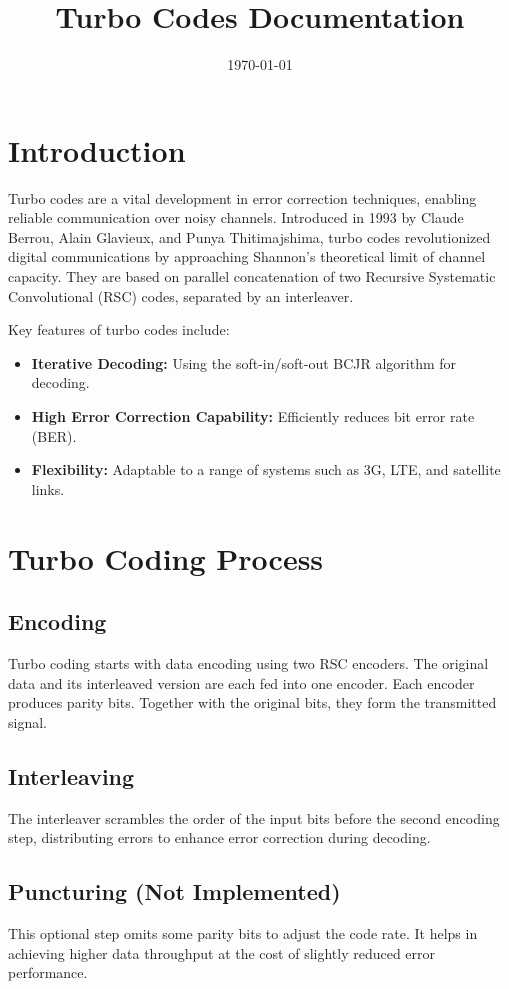 \documentclass[12pt]{article}
\title{Turbo Codes Documentation}
\date{\today}
\begin{document}
\maketitle

\section*{Introduction}
Turbo codes are a vital development in error correction techniques, enabling reliable communication over noisy channels. Introduced in 1993 by Claude Berrou, Alain Glavieux, and Punya Thitimajshima, turbo codes revolutionized digital communications by approaching Shannon's theoretical limit of channel capacity. They are based on parallel concatenation of two Recursive Systematic Convolutional (RSC) codes, separated by an interleaver.

Key features of turbo codes include:
\begin{itemize}
    \item \textbf{Iterative Decoding:} Using the soft-in/soft-out BCJR algorithm for decoding.
    \item \textbf{High Error Correction Capability:} Efficiently reduces bit error rate (BER).
    \item \textbf{Flexibility:} Adaptable to a range of systems such as 3G, LTE, and satellite links.
\end{itemize}

\section*{Turbo Coding Process}
\subsection*{Encoding}
Turbo coding starts with data encoding using two RSC encoders. The original data and its interleaved version are each fed into one encoder. Each encoder produces parity bits. Together with the original bits, they form the transmitted signal.

\subsection*{Interleaving}
The interleaver scrambles the order of the input bits before the second encoding step, distributing errors to enhance error correction during decoding.

\subsection*{Puncturing (Not Implemented)}
This optional step omits some parity bits to adjust the code rate. It helps in achieving higher data throughput at the cost of slightly reduced error performance.
\end{document}
